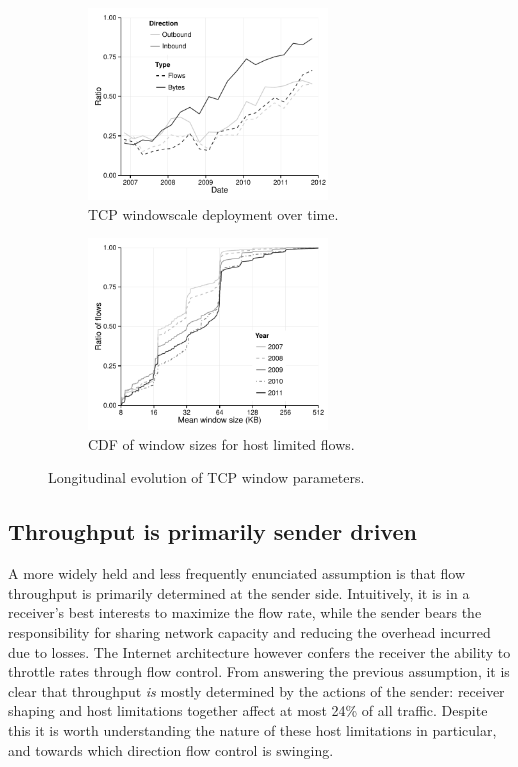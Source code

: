\begin{figure}[t]
    \begin{subfigure}[b]{.5\linewidth}
        \centering
        \includegraphics[width=2.5in]{figures/malawi/windowscale}
        \caption{\acs{TCP} windowscale deployment over time. \label{fig:windowscale}}
    \end{subfigure}%
    \begin{subfigure}[b]{.5\linewidth}
        \centering
        \includegraphics[width=2.5in]{figures/malawi/hostwindow}
        \caption{CDF of window sizes for host limited flows.\label{fig:hostwindow}}
    \end{subfigure}%
    \caption{Longitudinal evolution of \acs{TCP} window parameters. \label{fig:tcpWindowParams}}
\end{figure}



\subsection{Throughput is primarily sender driven}

A more widely held and less frequently enunciated assumption is that flow throughput is primarily determined at the sender side. 
Intuitively, it is in a receiver's best interests to maximize the flow rate, while the sender bears the responsibility for sharing network capacity and reducing the overhead incurred due to losses. 
The Internet architecture however confers the receiver the ability to throttle rates through flow control. 
From answering the previous assumption, it is clear that throughput \textit{is} mostly determined by the actions of the sender: receiver shaping and host limitations together affect at most 24\% of all traffic. 
Despite this it is worth understanding the nature of these host limitations in particular, and towards which direction flow control is swinging.

